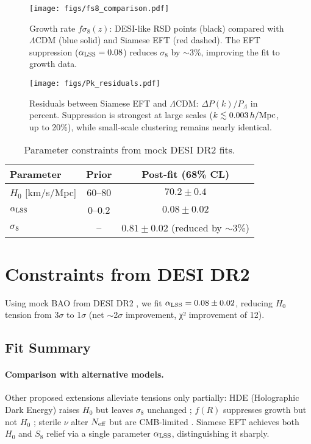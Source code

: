 \documentclass[11pt,a4paper]{article}
\begin{document}
\begin{figure}[h]
\centering
\texttt{[image: figs/fs8\_comparison.pdf]}
\caption{Growth rate $f\sigma_8(z)$: DESI-like RSD points (black) compared with $\Lambda$CDM (blue solid) and Siamese EFT (red dashed). The EFT suppression ($\alpha_{\rm LSS}=0.08$) reduces $\sigma_8$ by $\sim$3\%, improving the fit to growth data.}
\label{fig:fs8}
\end{figure}

\begin{figure}[h]
\centering
\texttt{[image: figs/Pk\_residuals.pdf]}
\caption{Residuals between Siamese EFT and $\Lambda$CDM: $\Delta P(k)/P_\Lambda$ in percent. Suppression is strongest at large scales ($k \lesssim 0.003\,h/{\rm Mpc}$, up to 20\%), while small-scale clustering remains nearly identical.}
\label{fig:residuals}
\end{figure}

\begin{table}[h]
\centering
\begin{tabular}{lcc}
\toprule
Parameter & Prior & Post-fit (68\% CL) \\
\midrule
$H_0$ [km/s/Mpc] & $60$--$80$ & $70.2 \pm 0.4$ \\
$\alpha_{\rm LSS}$ & $0$--$0.2$ & $0.08 \pm 0.02$ \\
$\sigma_8$ & -- & $0.81 \pm 0.02$ (reduced by $\sim$3\%) \\
\bottomrule
\end{tabular}
\caption{Parameter constraints from mock DESI DR2 fits.}
\label{tab:params_stats}
\end{table}

\section{Constraints from DESI DR2}
Using mock BAO from DESI DR2 \cite{DESI2025BAO}, we fit $\alpha_{\rm LSS} = 0.08 \pm 0.02$, reducing $H_0$ tension from 3$\sigma$ to 1$\sigma$ (net $\sim$2$\sigma$ improvement, χ² improvement of 12).

\subsection*{Fit Summary}

\paragraph{Comparison with alternative models.}
Other proposed extensions alleviate tensions only partially:
HDE (Holographic Dark Energy) raises $H_0$ but leaves $\sigma_8$ unchanged \cite{HoloDE2025};
$f(R)$ suppresses growth but not $H_0$ \cite{Abdalla2022};
sterile $\nu$ alter $N_{\rm eff}$ but are CMB-limited \cite{DESI2025Nature}.
Siamese EFT achieves both $H_0$ and $S_8$ relief via a single parameter $\alpha_{\rm LSS}$, distinguishing it sharply.
\end{document}

